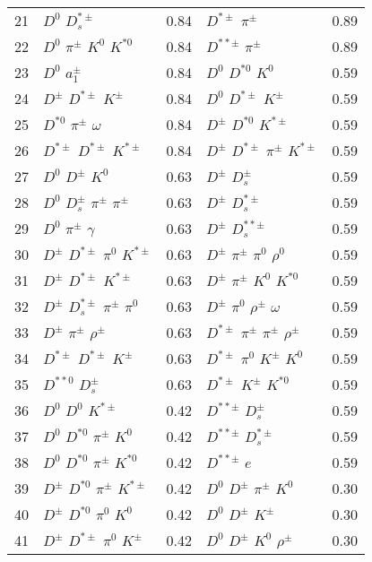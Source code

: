 \documentclass[6pt]{article}
\begin{document}
\begin{tabular}{rlr|lr}
21 & $D^0$ $D_s^{*\pm}$ & 0.84 & $D^{*\pm}$ $\pi^{\pm}$ & 0.89 \\
22 & $D^0$ $\pi^{\pm}$ $K^0$ $K^{*0}$ & 0.84 & $D^{**\pm}$ $\pi^{\pm}$ & 0.89 \\
23 & $D^0$ $a_1^{\pm}$ & 0.84 & $D^0$ $D^{*0}$ $K^0$ & 0.59 \\
24 & $D^{\pm}$ $D^{*\pm}$ $K^{\pm}$ & 0.84 & $D^0$ $D^{*\pm}$ $K^{\pm}$ & 0.59 \\
25 & $D^{*0}$ $\pi^{\pm}$ $\omega$ & 0.84 & $D^{\pm}$ $D^{*0}$ $K^{*\pm}$ & 0.59 \\
26 & $D^{*\pm}$ $D^{*\pm}$ $K^{*\pm}$ & 0.84 & $D^{\pm}$ $D^{*\pm}$ $\pi^{\pm}$ $K^{*\pm}$ & 0.59 \\
27 & $D^0$ $D^{\pm}$ $K^0$ & 0.63 & $D^{\pm}$ $D_s^{\pm}$ & 0.59 \\
28 & $D^0$ $D_s^{\pm}$ $\pi^{\pm}$ $\pi^{\pm}$ & 0.63 & $D^{\pm}$ $D_s^{*\pm}$ & 0.59 \\
29 & $D^0$ $\pi^{\pm}$ $\gamma$ & 0.63 & $D^{\pm}$ $D_s^{**\pm}$ & 0.59 \\
30 & $D^{\pm}$ $D^{*\pm}$ $\pi^0$ $K^{*\pm}$ & 0.63 & $D^{\pm}$ $\pi^{\pm}$ $\pi^0$ $\rho^0$ & 0.59 \\
31 & $D^{\pm}$ $D^{*\pm}$ $K^{*\pm}$ & 0.63 & $D^{\pm}$ $\pi^{\pm}$ $K^0$ $K^{*0}$ & 0.59 \\
32 & $D^{\pm}$ $D_s^{*\pm}$ $\pi^{\pm}$ $\pi^0$ & 0.63 & $D^{\pm}$ $\pi^0$ $\rho^{\pm}$ $\omega$ & 0.59 \\
33 & $D^{\pm}$ $\pi^{\pm}$ $\rho^{\pm}$ & 0.63 & $D^{*\pm}$ $\pi^{\pm}$ $\pi^{\pm}$ $\rho^{\pm}$ & 0.59 \\
34 & $D^{*\pm}$ $D^{*\pm}$ $K^{\pm}$ & 0.63 & $D^{*\pm}$ $\pi^0$ $K^{\pm}$ $K^0$ & 0.59 \\
35 & $D^{**0}$ $D_s^{\pm}$ & 0.63 & $D^{*\pm}$ $K^{\pm}$ $K^{*0}$ & 0.59 \\
36 & $D^0$ $D^0$ $K^{*\pm}$ & 0.42 & $D^{**\pm}$ $D_s^{\pm}$ & 0.59 \\
37 & $D^0$ $D^{*0}$ $\pi^{\pm}$ $K^0$ & 0.42 & $D^{**\pm}$ $D_s^{*\pm}$ & 0.59 \\
38 & $D^0$ $D^{*0}$ $\pi^{\pm}$ $K^{*0}$ & 0.42 & $D^{**\pm}$ $e$ & 0.59 \\
39 & $D^{\pm}$ $D^{*0}$ $\pi^{\pm}$ $K^{*\pm}$ & 0.42 & $D^0$ $D^{\pm}$ $\pi^{\pm}$ $K^0$ & 0.30 \\
40 & $D^{\pm}$ $D^{*0}$ $\pi^0$ $K^0$ & 0.42 & $D^0$ $D^{\pm}$ $K^{\pm}$ & 0.30 \\
41 & $D^{\pm}$ $D^{*\pm}$ $\pi^0$ $K^{\pm}$ & 0.42 & $D^0$ $D^{\pm}$ $K^0$ $\rho^{\pm}$ & 0.30 \\

\end{tabular}
\end{document}
